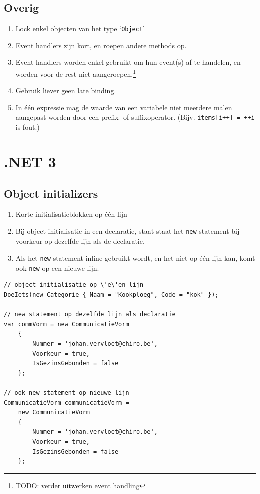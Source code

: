 \documentclass[a4paper,11pt]{article}
\begin{document}
\subsection{Overig}

\begin{enumerate}[resume]
\item Lock enkel objecten van het type `\lstinline !Object!'
\item Event handlers zijn kort, en roepen andere methods op.
\item Event handlers worden enkel gebruikt om hun event(s) af te handelen, en worden voor de rest
niet aangeroepen.\footnote{TODO: verder uitwerken event handling}
\item Gebruik liever geen late binding.
\item In \'e\'en expressie mag de waarde van een variabele niet meerdere
malen aangepast worden door een prefix- of suffixoperator.\index{++}\index{--}  (Bijv. 
\lstinline !items[i++] = ++i! is fout.)
\end{enumerate}

\section{.NET 3}
\subsection{Object initializers}

\begin{enumerate}[resume]
\item Korte initialisatieblokken op \'e\'en lijn
\item Bij object initialisatie in een declaratie, staat staat het
\lstinline !new!-statement bij voorkeur op dezelfde lijn als de
declaratie.
\item Als het \lstinline !new!-statement inline gebruikt wordt, en het
niet op \'e\'en lijn kan, komt ook \lstinline !new! op een nieuwe lijn.
\end{enumerate}
\begin{lstlisting}[float,caption = Object initializers]
// object-initialisatie op \'e\'en lijn
DoeIets(new Categorie { Naam = "Kookploeg", Code = "kok" });

// new statement op dezelfde lijn als declaratie
var commVorm = new CommunicatieVorm
	{
		Nummer = 'johan.vervloet@chiro.be',
		Voorkeur = true,
		IsGezinsGebonden = false
	};

// ook new statement op nieuwe lijn
CommunicatieVorm communicatieVorm =
	new CommunicatieVorm
	{
		Nummer = 'johan.vervloet@chiro.be',
		Voorkeur = true,
		IsGezinsGebonden = false
	};
\end{lstlisting}
\end{document}
